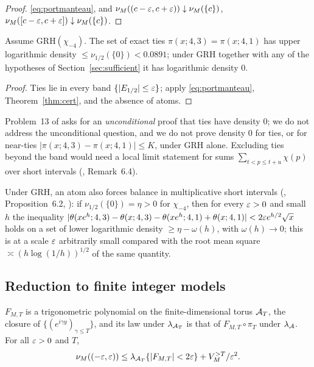 \begin{proof}
\eqref{eq:portmanteau}, and $\nu_M((c-\varepsilon,c+\varepsilon))\downarrow\nu_M(\{c\})$, $\nu_M([c-\varepsilon,c+\varepsilon])\downarrow\nu_M(\{c\})$.
\end{proof}

\begin{corollary}\label{cor:ties}
Assume GRH$(\chi_{-4})$. The set of exact ties $\pi(x;4,3)=\pi(x;4,1)$ has upper logarithmic density $\le\nu_{1/2}(\{0\})<0.0891$; under GRH together with any of the hypotheses of Section~\ref{sec:sufficient} it has logarithmic density $0$.
\end{corollary}

\begin{proof}
Ties lie in every band $\{|E_{1/2}|\le\varepsilon\}$; apply \eqref{eq:portmanteau}, Theorem~\ref{thm:cert}, and the absence of atoms.
\end{proof}

\begin{remark}[ties]\label{rem:ties}
Problem~13 of \cite{HKMN} asks for an \emph{unconditional} proof that ties have density $0$; we do not address the unconditional question, and we do not prove density $0$ for ties, or for near-ties $|\pi(x;4,3)-\pi(x;4,1)|\le K$, under GRH alone. Excluding ties beyond the band would need a local limit statement for sums $\sum_{t<p\le t+u}\chi(p)$ over short intervals (, Remark~6.4).
\end{remark}

Under GRH, an atom also forces balance in multiplicative short intervals (, Proposition~6.2, ): if $\nu_{1/2}(\{0\})=\eta>0$ for $\chi_{-4}$, then for every $\varepsilon>0$ and small $h$ the inequality $|\theta(xe^h;4,3)-\theta(x;4,3)-\theta(xe^h;4,1)+\theta(x;4,1)|<2\varepsilon e^{h/2}\sqrt x$ holds on a set of lower logarithmic density $\ge\eta-\omega(h)$, with $\omega(h)\to0$; this is at a scale $\varepsilon$ arbitrarily small compared with the root mean square $\asymp(h\log(1/h))^{1/2}$ of the same quantity.

\subsection{Reduction to finite integer models}

\begin{lemma}\label{lem:reduction}
$F_{M,T}$ is a trigonometric polynomial on the finite-dimensional torus $\mathcal A_T$, the closure of $\{(e^{i\gamma y})_{\gamma\le T}\}$, and its law under $\lambda_{\mathcal A_T}$ is that of $F_{M,T}\circ\pi_T$ under $\lambda_{\mathcal A}$. For all $\varepsilon>0$ and $T$,
\[
\nu_M((-\varepsilon,\varepsilon))\le\lambda_{\mathcal A_T}\{|F_{M,T}|<2\varepsilon\}+V_M^{>T}/\varepsilon^2 .
\]
\end{lemma}

